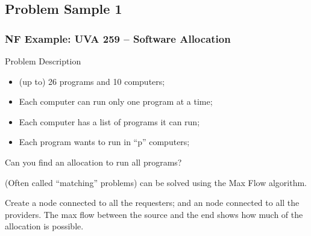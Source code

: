 \documentclass{beamer}
\begin{document}
\subsection{Problem Sample 1}
\begin{frame}
  \frametitle{NF Example: UVA 259 -- Software Allocation}
  
  {\smaller
    \begin{block}{Problem Description}
      \begin{itemize}
      \item (up to) 26 programs and 10 computers;
      \item Each computer can run only one program at a time;
      \item Each computer has a list of programs it can run;
      \item Each program wants to run in ``p'' computers;
      \end{itemize}
      Can you find an allocation to run all programs?
    \end{block}

    \bigskip
    
     (Often called ``matching''
    problems) can be solved using the Max Flow algorithm. 

    \smallskip

    Create a  node connected to all the requesters;
    and an  node connected to all the providers. The
    max flow between the source and the end shows how much of the
    allocation is possible.
    }
\end{frame}
\end{document}
